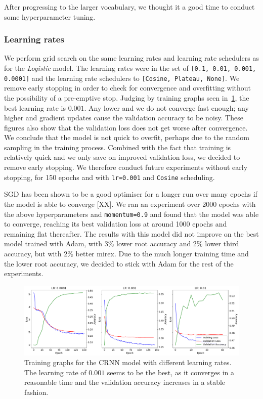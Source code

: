After progressing to the larger vocabulary, we thought it a good time to conduct some hyperparameter tuning. 

\subsubsection{Learning rates}

We perform grid search on the same learning rates and learning rate schedulers as for the \emph{Logistic} model. The learning rates were in the set of \texttt{[0.1, 0.01, 0.001, 0.0001]} and the learning rate schedulers to \texttt{[Cosine, Plateau, None]}. We remove early stopping in order to check for convergence and overfitting without the possibility of a pre-emptive stop. Judging by training graphs seen in~\ref{fig:lr_search_cosine}, the best learning rate is $0.001$. Any lower and we do not converge fast enough; any higher and gradient updates cause the validation accuracy to be noisy. These figures also show that the validation loss does not get worse after convergence. We conclude that the model is not quick to overfit, perhaps due to the random sampling in the training process. Combined with the fact that training is relatively quick and we only save on improved validation loss, we decided to remove early stopping. We therefore conduct future experiments without early stopping, for 150 epochs and with \texttt{lr=0.001} and \texttt{Cosine} scheduling.

SGD has been shown to be a good optimiser for a longer run over many epochs if the model is able to converge [XX]. We ran an experiment over 2000 epochs with the above hyperparameters and \texttt{momentum=0.9} and found that the model was able to converge, reaching its best validation loss at around 1000 epochs and remaining flat thereafter. The results with this model did not improve on the best model trained with Adam, with 3\% lower root accuracy and 2\% lower third accuracy, but with 2\% better mirex. Due to the much longer training time and the lower root accuracy, we decided to stick with Adam for the rest of the experiments.

\begin{figure}[H]
    \centering
    \includegraphics[width=1.0\textwidth]{figures/lr_search_cosine.png}
    \caption{Training graphs for the CRNN model with different learning rates. The learning rate of $0.001$ seems to be the best, as it converges in a reasonable time and the validation accuracy increases in a stable fashion.}\label{fig:lr_search_cosine}
\end{figure}

